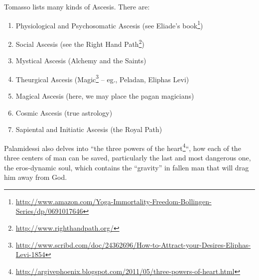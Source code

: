 Tomasso lists many kinds of Ascesis. There are:

\begin{enumerate}
\item Physiological and Psychosomatic Ascesis (see Eliade's book\footnote{\url{http://www.amazon.com/Yoga-Immortality-Freedom-Bollingen-Series/dp/0691017646}})

\item Social Ascesis (see the Right Hand Path\footnote{\url{http://www.righthandpath.org/}})

\item Mystical Ascesis (Alchemy and the Saints)

\item Theurgical Ascesis (Magic\footnote{\url{http://www.scribd.com/doc/24362696/How-to-Attract-your-Desires-Eliphas-Levi-1854}} -- eg., Peladan, Eliphas Levi)

\item Magical Ascesis (here, we may place the pagan magicians)

\item Cosmic Ascesis (true astrology)

\item Sapiental and Initiatic Ascesis (the Royal Path)
\end{enumerate}

Palamidessi also delves into ``the three powers of the heart\footnote{\url{http://argivephoenix.blogspot.com/2011/05/three-powers-of-heart.html}}``, how each of the three centers of man can be saved, particularly the last and most dangerous one, the eros-dynamic soul, which contains the ``gravity'' in fallen man that will drag him away from God.



